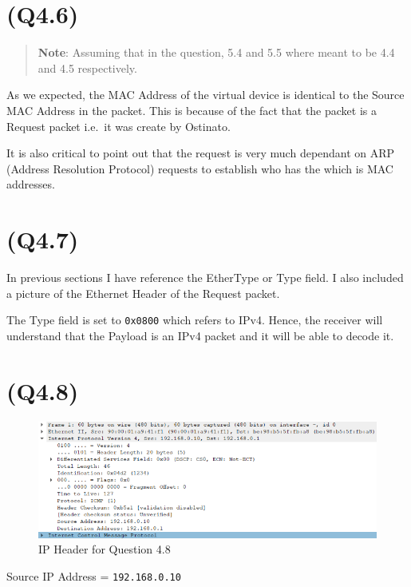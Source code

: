 \hypertarget{q4.6}{%
\section{(Q4.6)}\label{q4.6}}

\begin{quote}
\textbf{Note}: Assuming that in the question, 5.4 and 5.5 where meant to
be 4.4 and 4.5 respectively.
\end{quote}

As we expected, the MAC Address of the virtual device is identical to
the Source MAC Address in the packet. This is because of the fact that
the packet is a Request packet i.e.~it was create by Ostinato.

It is also critical to point out that the request is very much dependant
on ARP (Address Resolution Protocol) requests to establish who has the
which is MAC addresses.

\hypertarget{q4.7}{%
\section{(Q4.7)}\label{q4.7}}

In previous sections I have reference the EtherType or Type field. I
also included a picture of the Ethernet Header of the Request packet.

The Type field is set to \texttt{0x0800} which refers to IPv4. Hence,
the receiver will understand that the Payload is an IPv4 packet and it
will be able to decode it.

\hypertarget{q4.8}{%
\section{(Q4.8)}\label{q4.8}}

\begin{figure}
\centering
\includegraphics{data/q4.8-ip-header.png}
\caption{IP Header for Question 4.8}
\end{figure}

Source IP Address = \texttt{192.168.0.10}

